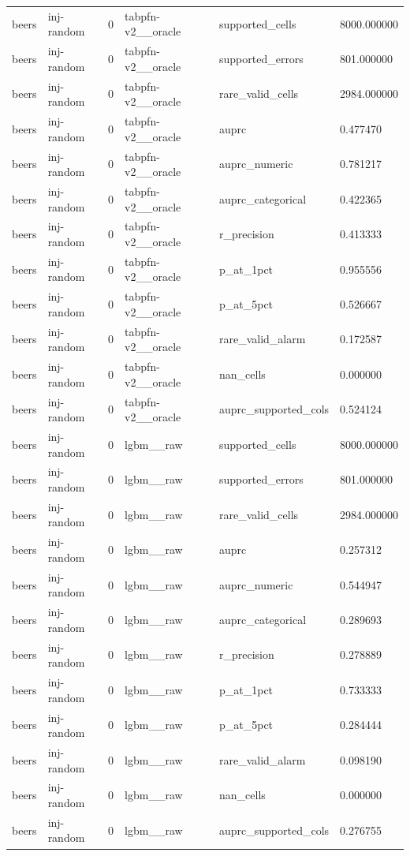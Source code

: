 \begin{tabular}{llllll}
beers & inj-random & 0 & tabpfn-v2\_\_oracle & supported\_cells & 8000.000000 \\
beers & inj-random & 0 & tabpfn-v2\_\_oracle & supported\_errors & 801.000000 \\
beers & inj-random & 0 & tabpfn-v2\_\_oracle & rare\_valid\_cells & 2984.000000 \\
beers & inj-random & 0 & tabpfn-v2\_\_oracle & auprc & 0.477470 \\
beers & inj-random & 0 & tabpfn-v2\_\_oracle & auprc\_numeric & 0.781217 \\
beers & inj-random & 0 & tabpfn-v2\_\_oracle & auprc\_categorical & 0.422365 \\
beers & inj-random & 0 & tabpfn-v2\_\_oracle & r\_precision & 0.413333 \\
beers & inj-random & 0 & tabpfn-v2\_\_oracle & p\_at\_1pct & 0.955556 \\
beers & inj-random & 0 & tabpfn-v2\_\_oracle & p\_at\_5pct & 0.526667 \\
beers & inj-random & 0 & tabpfn-v2\_\_oracle & rare\_valid\_alarm & 0.172587 \\
beers & inj-random & 0 & tabpfn-v2\_\_oracle & nan\_cells & 0.000000 \\
beers & inj-random & 0 & tabpfn-v2\_\_oracle & auprc\_supported\_cols & 0.524124 \\
beers & inj-random & 0 & lgbm\_\_raw & supported\_cells & 8000.000000 \\
beers & inj-random & 0 & lgbm\_\_raw & supported\_errors & 801.000000 \\
beers & inj-random & 0 & lgbm\_\_raw & rare\_valid\_cells & 2984.000000 \\
beers & inj-random & 0 & lgbm\_\_raw & auprc & 0.257312 \\
beers & inj-random & 0 & lgbm\_\_raw & auprc\_numeric & 0.544947 \\
beers & inj-random & 0 & lgbm\_\_raw & auprc\_categorical & 0.289693 \\
beers & inj-random & 0 & lgbm\_\_raw & r\_precision & 0.278889 \\
beers & inj-random & 0 & lgbm\_\_raw & p\_at\_1pct & 0.733333 \\
beers & inj-random & 0 & lgbm\_\_raw & p\_at\_5pct & 0.284444 \\
beers & inj-random & 0 & lgbm\_\_raw & rare\_valid\_alarm & 0.098190 \\
beers & inj-random & 0 & lgbm\_\_raw & nan\_cells & 0.000000 \\
beers & inj-random & 0 & lgbm\_\_raw & auprc\_supported\_cols & 0.276755 \\

\end{tabular}
